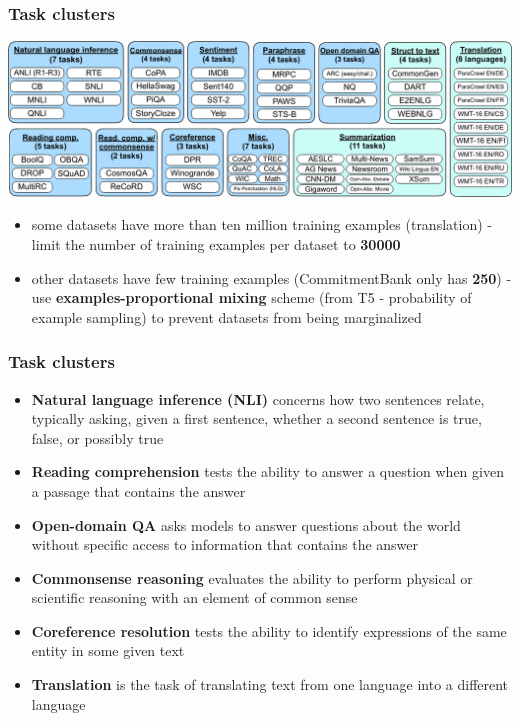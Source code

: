 \documentclass{beamer}
\begin{document}
\begin{frame}
    \frametitle{Task clusters}
    \begin{center}
        \includegraphics[scale=1.2]{img/task_clusters.png}
    \end{center}
    \begin{itemize}
        \item \footnotesize{some datasets have more than ten million training examples (translation) - limit the number of training examples per dataset to \textbf{30000}}
        \item \footnotesize{other datasets have few training examples (CommitmentBank only has \textbf{250}) - use \textbf{examples-proportional mixing} scheme (from T5 - probability of example sampling) to prevent datasets from being marginalized}
    \end{itemize}
\end{frame}

\begin{frame}
    \frametitle{Task clusters}
    \begin{itemize}
    \footnotesize
        \item \textbf{Natural language inference (NLI)} concerns how two sentences relate, typically asking, given a first sentence, whether a second sentence is true, false, or possibly true
        \item \textbf{Reading comprehension} tests the ability to answer a question when given a passage that contains the answer
        \item \textbf{Open-domain QA} asks models to answer questions about the world without specific access to information that contains the answer
        \item \textbf{Commonsense reasoning} evaluates the ability to perform physical or scientific reasoning with an element of common sense
        \item \textbf{Coreference resolution} tests the ability to identify expressions of the same entity in some given text
        \item \textbf{Translation} is the task of translating text from one language into a different language
    \end{itemize}
\end{frame}
\end{document}

